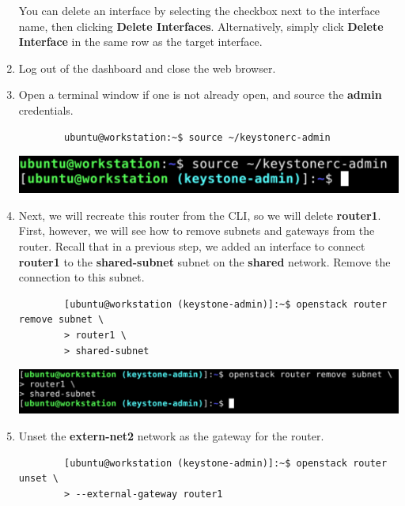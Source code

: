 \documentclass[letterpaper, 12pt]{article}
\begin{document}
\begin{enumerate}
    \begin{tipbox}
        You can delete an interface by selecting the checkbox next to the interface name, then clicking \textbf{Delete Interfaces}.
        Alternatively, simply click \textbf{Delete Interface} in the same row as the target interface.
    \end{tipbox}

    \item Log out of the dashboard and close the web browser.

    \item Open a terminal window if one is not already open, and source the \textbf{admin} credentials.
    \begin{lstlisting}
        ubuntu@workstation:~$ source ~/keystonerc-admin
    \end{lstlisting}

    \begin{center}
        \includegraphics[width=\linewidth]{images/part2/step8.png}
    \end{center}

    \item Next, we will recreate this router from the CLI, so we will delete \textbf{router1}.
    First, however, we will see how to remove subnets and gateways from the router.
    Recall that in a previous step, we added an interface to connect \textbf{router1} to the \textbf{shared-subnet} subnet on the \textbf{shared} network.
    Remove the connection to this subnet.
    \begin{lstlisting}
        [ubuntu@workstation (keystone-admin)]:~$ openstack router remove subnet \
        > router1 \
        > shared-subnet
    \end{lstlisting}

    \begin{center}
        \includegraphics[width=\linewidth]{images/part2/step9.png}
    \end{center}

    \item Unset the \textbf{extern-net2} network as the gateway for the router.
    \begin{lstlisting}
        [ubuntu@workstation (keystone-admin)]:~$ openstack router unset \
        > --external-gateway router1
    \end{lstlisting}


\end{enumerate}
\end{document}
